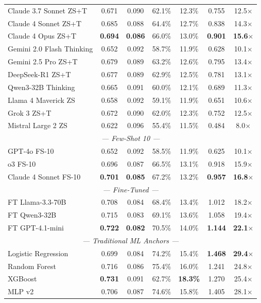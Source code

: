 \documentclass[11pt, a4paper]{article}
\begin{document}
\begin{table}[H]
\begin{tabular}{@{}lcccccc@{}}
Claude 3.7 Sonnet ZS+T      & 0.671 & 0.090 & 62.1\% & 12.3\% & 0.755 & 12.5$\times$\\
Claude 4 Sonnet ZS+T        & 0.685 & 0.088 & 64.4\% & 12.7\% & 0.838 & 14.3$\times$\\
Claude 4 Opus ZS+T          & \textbf{0.694} & \textbf{0.086} & 66.0\% & 13.0\% & \textbf{0.901} & \textbf{15.6$\times$}\\
Gemini 2.0 Flash Thinking   & 0.652 & 0.092 & 58.7\% & 11.9\% & 0.628 & 10.1$\times$\\
Gemini 2.5 Pro ZS+T         & 0.679 & 0.089 & 63.2\% & 12.6\% & 0.795 & 13.4$\times$\\
DeepSeek-R1 ZS+T            & 0.677 & 0.089 & 62.9\% & 12.5\% & 0.781 & 13.1$\times$\\
Qwen3-32B Thinking          & 0.665 & 0.091 & 60.0\% & 12.1\% & 0.689 & 11.3$\times$\\
Llama 4 Maverick ZS         & 0.658 & 0.092 & 59.1\% & 11.9\% & 0.651 & 10.6$\times$\\
Grok 3 ZS+T                 & 0.672 & 0.090 & 62.0\% & 12.3\% & 0.752 & 12.5$\times$\\
Mistral Large 2 ZS          & 0.622 & 0.096 & 55.4\% & 11.5\% & 0.484 & 8.0$\times$\\
\midrule
\multicolumn{7}{c}{\textit{--- Few-Shot 10 ---}}\\
GPT-4o FS-10                & 0.652 & 0.092 & 58.5\% & 11.9\% & 0.625 & 10.1$\times$\\
o3 FS-10                    & 0.696 & 0.087 & 66.5\% & 13.1\% & 0.918 & 15.9$\times$\\
Claude 4 Sonnet FS-10       & \textbf{0.701} & \textbf{0.085} & 67.2\% & 13.2\% & \textbf{0.957} & \textbf{16.8$\times$}\\
\midrule
\multicolumn{7}{c}{\textit{--- Fine-Tuned ---}}\\
FT Llama-3.3-70B            & 0.708 & 0.084 & 68.4\% & 13.4\% & 1.012 & 18.2$\times$\\
FT Qwen3-32B                & 0.715 & 0.083 & 69.1\% & 13.6\% & 1.058 & 19.4$\times$\\
FT GPT-4.1-mini             & \textbf{0.722} & \textbf{0.082} & 70.5\% & 14.0\% & \textbf{1.144} & \textbf{22.1$\times$}\\
\midrule
\multicolumn{7}{c}{\textit{--- Traditional ML Anchors ---}}\\
Logistic Regression         & 0.699 & \cellcolor{best}0.084 & 74.2\% & 15.4\% & \cellcolor{best}\textbf{1.468} & \cellcolor{best}\textbf{29.4$\times$}\\
Random Forest               & 0.716 & 0.086 & 75.4\% & 16.0\% & 1.241 & 24.8$\times$\\
XGBoost                     & \cellcolor{best}\textbf{0.731} & 0.091 & 62.7\% & \textbf{18.3\%} & 1.270 & 25.4$\times$\\
MLP v2                      & 0.706 & 0.087 & 74.6\% & 15.8\% & 1.405 & 28.1$\times$\\
\bottomrule
\end{tabular}
\end{table}
\end{document}
